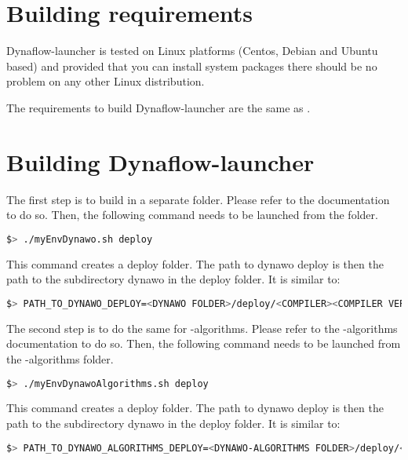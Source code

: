 \documentclass[a4paper, 12pt]{report}
\begin{document}
\section{Building requirements}

Dynaflow-launcher is tested on Linux platforms (Centos, Debian and Ubuntu based) and provided that you can install system packages there should be no problem on any other Linux distribution.

The requirements to build Dynaflow-launcher are the same as \Dynawo.

\section[Building Dynaflow-launcher]{Building Dynaflow-launcher}
\label{Dynaflow_launcher_Installation_Documentation_Building_Dynaflow_launcher}
The first step is to build \Dynawo in a separate folder. Please refer to the \Dynawo documentation to do so.
Then, the following command needs to be launched from the \Dynawo folder.

\begin{lstlisting}[language=bash, columns=fullflexible]
$> ./myEnvDynawo.sh deploy
\end{lstlisting}

This command creates a deploy folder. The path to dynawo deploy is then the path to the subdirectory dynawo in the deploy folder. It is similar to:

\begin{lstlisting}[language=bash, columns=fullflexible]
$> PATH_TO_DYNAWO_DEPLOY=<DYNAWO FOLDER>/deploy/<COMPILER><COMPILER VERSION>/shared/dynawo/
\end{lstlisting}

The second step is to do the same for \Dynawo-algorithms. Please refer to the \Dynawo-algorithms documentation to do so.
Then, the following command needs to be launched from the \Dynawo-algorithms folder.

\begin{lstlisting}[language=bash, columns=fullflexible]
$> ./myEnvDynawoAlgorithms.sh deploy
\end{lstlisting}

This command creates a deploy folder. The path to dynawo deploy is then the path to the subdirectory dynawo in the deploy folder. It is similar to:

\begin{lstlisting}[language=bash, columns=fullflexible]
$> PATH_TO_DYNAWO_ALGORITHMS_DEPLOY=<DYNAWO-ALGORITHMS FOLDER>/deploy/<COMPILER><COMPILER VERSION>/shared/dynawo/
\end{lstlisting}
\end{document}
